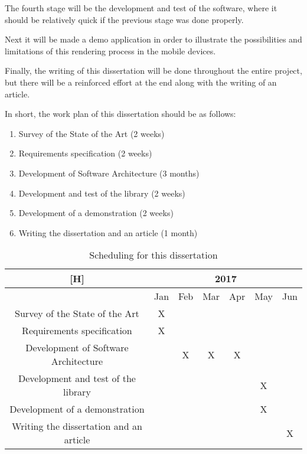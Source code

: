 \par
The fourth stage will be the development and test of the software, where it should be relatively quick if the previous stage was done properly.

\par
Next it will be made a demo application in order to illustrate the possibilities and limitations of this rendering process in the mobile devices.

\par
Finally, the writing of this dissertation will be done throughout the entire project, but there will be a reinforced effort at the end along with the writing of an article.

\par
In short, the work plan of this dissertation should be as follows:

\begin{enumerate}

\item Survey of the State of the Art (2 weeks)
\item Requirements specification (2 weeks)
\item Development of Software Architecture (3 months)
\item Development and test of the library (2 weeks)
\item Development of a demonstration (2 weeks)
\item Writing the dissertation and an article (1 month)

\end{enumerate}

\begin{table}[H]
\centering
\caption{Scheduling for this dissertation}
\label{Scheduling for this dissertation}
\begin{tabular}{|c|c|c|c|c|c|c|}[H]
\hline
\textbf{}                               & \multicolumn{6}{c|}{\textbf{2017}} \\ \hline
                                        & Jan  & Feb & Mar & Apr & May & Jun \\ \hline
Survey of the State of the Art          & X    &     &     &     &     &     \\ \hline
Requirements specification              & X    &     &     &     &     &     \\ \hline
Development of Software Architecture    &      & X   & X   & X   &     &     \\ \hline
Development and test of the library     &      &     &     &     & X   &     \\ \hline
Development of a demonstration          &      &     &     &     & X   &     \\ \hline
Writing the dissertation and an article &      &     &     &     &     & X   \\ \hline
\end{tabular}
\end{table}


